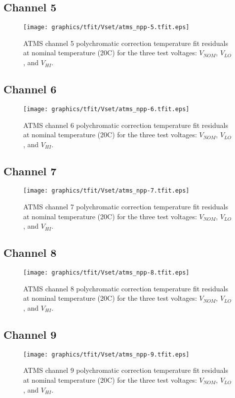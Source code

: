 \subsection{Channel 5}
\begin{figure}[H]
  \label{fig:Vset.ch5_tfit}
  \centering
  \texttt{[image: graphics/tfit/Vset/atms\_npp-5.tfit.eps]}
  \caption{ATMS channel 5 polychromatic correction temperature fit residuals at nominal temperature (20\textdegree{}C) for the three test voltages: $V_{NOM}$, $V_{LO}$, and $V_{HI}$.}
\end{figure}

\subsection{Channel 6}
\begin{figure}[H]
  \label{fig:Vset.ch6_tfit}
  \centering
  \texttt{[image: graphics/tfit/Vset/atms\_npp-6.tfit.eps]}
  \caption{ATMS channel 6 polychromatic correction temperature fit residuals at nominal temperature (20\textdegree{}C) for the three test voltages: $V_{NOM}$, $V_{LO}$, and $V_{HI}$.}
\end{figure}

\subsection{Channel 7}
\begin{figure}[H]
  \label{fig:Vset.ch7_tfit}
  \centering
  \texttt{[image: graphics/tfit/Vset/atms\_npp-7.tfit.eps]}
  \caption{ATMS channel 7 polychromatic correction temperature fit residuals at nominal temperature (20\textdegree{}C) for the three test voltages: $V_{NOM}$, $V_{LO}$, and $V_{HI}$.}
\end{figure}

\subsection{Channel 8}
\begin{figure}[H]
  \label{fig:Vset.ch8_tfit}
  \centering
  \texttt{[image: graphics/tfit/Vset/atms\_npp-8.tfit.eps]}
  \caption{ATMS channel 8 polychromatic correction temperature fit residuals at nominal temperature (20\textdegree{}C) for the three test voltages: $V_{NOM}$, $V_{LO}$, and $V_{HI}$.}
\end{figure}

\subsection{Channel 9}
\begin{figure}[H]
  \label{fig:Vset.ch9_tfit}
  \centering
  \texttt{[image: graphics/tfit/Vset/atms\_npp-9.tfit.eps]}
  \caption{ATMS channel 9 polychromatic correction temperature fit residuals at nominal temperature (20\textdegree{}C) for the three test voltages: $V_{NOM}$, $V_{LO}$, and $V_{HI}$.}
\end{figure}

